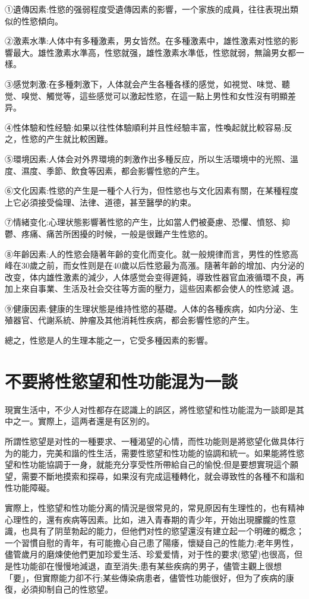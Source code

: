 \documentclass[12pt,UTF8]{ctexbook}
\begin{document}
①遺傳因素:性慾的强弱程度受遺傳因素的影響，一个家族的成員，往往表現出類似的性慾傾向。

②激素水準:人体中有多種激素，男女皆然。在多種激素中，雄性激素对性慾的影響最大。雄性激素水準高，性慾就强，雄性激素水準低，性慾就弱，無論男女都一樣。

③感觉刺激:在多種刺激下，人体就会产生各種各樣的感觉，如視觉、味觉、聽觉、嗅觉、觸觉等，這些感觉可以激起性慾，在這一點上男性和女性沒有明顯差异。

④性体驗和性经驗:如果以往性体驗順利并且性经驗丰富，性喚起就比較容易;反之，性慾的产生就比較困難。

⑤環境因素:人体会对外界環境的刺激作出多種反应，所以生活環境中的光照、溫度、濕度、季節、飲食等因素，都会影響性慾的产生。

⑥文化因素:性慾的产生是一種个人行为，但性慾也与文化因素有關，在某種程度上它必須接受倫理、法律、道德，甚至醫學的約束。

⑦情緒变化:心理状態影響著性慾的产生，比如當人們被憂慮、恐懼、憤怒、抑鬱、疼痛、痛苦所困擾的时候，一般是很難产生性慾的。

⑧年齡因素:人的性慾会隨著年齡的变化而变化。就一般規律而言，男性的性慾高峰在30歲之前，而女性则是在40歲以后性慾最为高漲。隨著年齡的增加、内分泌的改变，体内雄性激素的減少，人体感觉会变得遲鈍，導致性器官血液循環不良，再加上來自事業、生活及社会交往等方面的壓力，這些因素都会使人的性慾減
退。

⑨健康因素:健康的生理状態是维持性慾的基礎。人体的各種疾病，如内分泌、生殖器官、代謝系統、肿瘤及其他消耗性疾病，都会影響性慾的产生。

總之，性慾是人的生理本能之一，它受多種因素的影響。

\section{不要將性慾望和性功能混为一談}

現實生活中，不少人对性都存在認識上的誤区，將性慾望和性功能混为一談即是其中之一。實際上，這两者還是有区別的。

所謂性慾望是对性的一種要求、一種渴望的心情，而性功能则是將慾望化做具体行为的能力，完美和諧的性生活，需要性慾望和性功能的協調和統一。如果能將性慾望和性功能協調于一身，就能充分享受性所帶給自己的愉悅;但是要想實現這个願望，需要不斷地摸索和探尋，如果沒有完成這種轉化，就会導致性的各種不和諧和性功能障礙。

實際上，性慾望和性功能分离的情況是很常見的，常見原因有生理性的，也有精神心理性的，還有疾病等因素。比如，进入青春期的青少年，开始出現朦朧的性意識，也具有了阴莖勃起的能力，但他們对性的慾望還沒有建立起一个明確的概念；一个習慣自慰的青年，有可能擔心自己患了陽痿，懷疑自己的性能力;老年男性，儘管歲月的磨煉使他們更加珍爱生活、珍爱爱情，对于性的要求(慾望)也很高，但是性功能卻在慢慢地減退，直至消失;患有某些疾病的男子，儘管主觀上很想「要」，但實際能力卻不行;某些傳染病患者，儘管性功能很好，但为了疾病的康復，必須抑制自己的性慾望。
\end{document}
